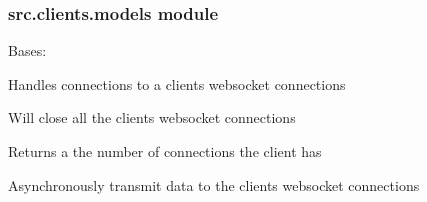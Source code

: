 \documentclass[letterpaper,10pt,english]{sphinxmanual}
\begin{document}
\subsubsection{src.clients.models module}
\label{\detokenize{src.clients:module-src.clients.models}}\label{\detokenize{src.clients:src-clients-models-module}}

\begin{fulllineitems}
\label{\detokenize{src.clients:src.clients.models.Client}}
Bases: 

Handles connections to a clients websocket connections

\begin{fulllineitems}
\label{\detokenize{src.clients:src.clients.models.Client.close}}
Will close all the clients websocket connections

\end{fulllineitems}


\begin{fulllineitems}
\label{\detokenize{src.clients:src.clients.models.Client.dict_repr}}
Returns a the number of connections the client has

\end{fulllineitems}


\begin{fulllineitems}
\label{\detokenize{src.clients:src.clients.models.Client.receive}}
Asynchronously transmit data to the clients websocket connections


\end{fulllineitems}
\end{fulllineitems}
\end{document}
